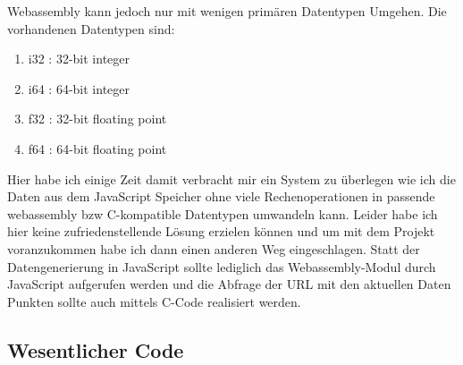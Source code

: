 Webassembly kann jedoch nur  mit wenigen primären Datentypen Umgehen. Die vorhandenen Datentypen sind: \\
\begin{enumerate}
        \item i32 : 32-bit integer
        \item i64 : 64-bit integer
        \item f32 : 32-bit floating point
        \item f64 : 64-bit floating point
\end{enumerate}
\begin{verbatim*}

\end{verbatim*}
Hier habe ich einige Zeit damit verbracht mir ein System zu überlegen wie ich die Daten aus dem JavaScript Speicher  ohne viele Rechenoperationen in passende webassembly bzw C-kompatible Datentypen umwandeln kann. Leider habe ich hier keine zufriedenstellende Lösung erzielen können und um mit dem Projekt voranzukommen habe ich dann einen anderen Weg eingeschlagen.  Statt der Datengenerierung  in JavaScript sollte lediglich das Webassembly-Modul durch JavaScript aufgerufen werden und die Abfrage der URL mit den aktuellen Daten Punkten sollte auch mittels C-Code realisiert werden. \\

\subsection{Wesentlicher Code}
